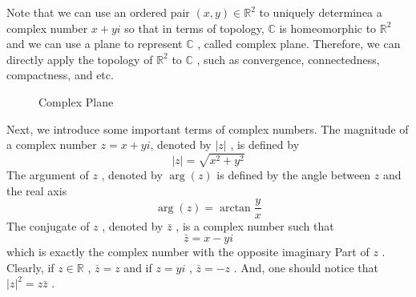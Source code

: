 \documentclass[12pt]{report}
\theoremstyle{mydefstyle}
\newcommand{\RR}{\mathbb{R}}
\newcommand{\CC}{\mathbb{C}}
\begin{document}
Note that we can use an ordered pair $(x,y)\in \RR^2$ to uniquely determinea a complex number $x+yi$ so that in terms of topology, $\CC$ is homeomorphic to $\RR^2$ and we can use a plane to represent $\CC$ , called complex plane. Therefore, we can directly apply the topology of $\RR^2$ to $\CC$ , such as convergence, connectedness, compactness, and etc.

\begin{figure}[htbp]
    \centering
    \caption{Complex Plane}
\end{figure}

Next, we introduce some important terms of complex numbers. The magnitude of a complex number $z=x+yi$, denoted by $|z|$ , is defined by
\[ |z|=\sqrt{x^2+y^2} \]
The argument of $z$ , denoted by $\arg(z)$ is defined by the angle between $z$ and the real axis
\[ \arg(z)=\arctan\frac{y}{x} \]
The conjugate of $z$ , denoted by $\bar{z}$ , is a complex number such that 
\[ \bar{z}=x-yi \]
which is exactly the complex number with the opposite imaginary Part of $z$ . Clearly, if $z \in \RR$ , $\bar{z}=z$ and if $z = yi$ , $\bar{z}=-z$ . And, one should notice that $|z|^2=z \bar{z}$ . 
\end{document}

